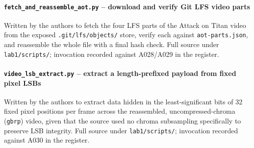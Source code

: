 \documentclass[11pt,a4paper,final,oneside]{article}
\begin{document}
\paragraph{\texttt{fetch\_and\_reassemble\_aot.py} -- download and verify Git LFS video parts}
Written by the authors to fetch the four LFS parts of the Attack on Titan video from the
exposed \texttt{.git/lfs/objects/} store, verify each against \texttt{aot-parts.json}, and
reassemble the whole file with a final hash check. Full source under \texttt{lab1/scripts/};
invocation recorded against A028/A029 in the register.

\paragraph{\texttt{video\_lsb\_extract.py} -- extract a length-prefixed payload from fixed pixel LSBs}
Written by the authors to extract data hidden in the least-significant bits of 32 fixed pixel
positions per frame across the reassembled, uncompressed-chroma (\texttt{gbrp}) video, given
that the source used no chroma subsampling specifically to preserve LSB integrity. Full
source under \texttt{lab1/scripts/}; invocation recorded against A030 in the register.
\end{document}
